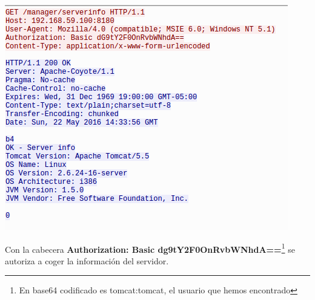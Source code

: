 \documentclass[a4paper,12pt]{scrartcl}
\begin{document}
\begin{center}
\includegraphics[width=1\linewidth]{cap2}

Con la cabecera \textbf{Authorization: Basic dg9tY2F0OnRvbWNhdA==}\footnote{En base64 codificado es tomcat:tomcat, el usuario que hemos encontrado} se autoriza a coger la información del servidor.

\end{center}

\newpage
\end{document}
